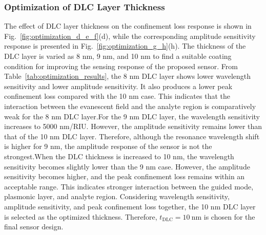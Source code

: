 \documentclass[preprint,12pt]{elsarticle}
\begin{document}
\subsubsection{\textbf{{Optimization of DLC Layer Thickness}}}
The effect of DLC layer thickness on the confinement loss response is shown in Fig.~\ref{fig:optimization_d_e_f}(d), while the corresponding amplitude sensitivity response is presented in Fig.~\ref{fig:optimization_g_h}(h).
The thickness of the DLC layer is varied as 8 nm, 9 nm, and 10 nm to find a suitable coating condition for improving the sensing response of the proposed sensor. From Table~\ref{tab:optimization_results}, the 8 nm DLC layer shows lower wavelength sensitivity and lower amplitude sensitivity. It also produces a lower peak confinement loss compared with the 10 nm case. This indicates that the interaction between the evanescent field and the analyte region is comparatively weak for the 8 nm DLC layer.For the 9 nm DLC layer, the wavelength sensitivity increases to 5000 nm/RIU. However, the amplitude sensitivity remains lower than that of the 10 nm DLC layer. Therefore, although the resonance wavelength shift is higher for 9 nm, the amplitude response of the sensor is not the strongest.When the DLC thickness is increased to 10 nm, the wavelength sensitivity becomes slightly lower than the 9 nm case. However, the amplitude sensitivity becomes higher, and the peak confinement loss remains within an acceptable range. This indicates stronger interaction between the guided mode, plasmonic layer, and analyte region. Considering wavelength sensitivity, amplitude sensitivity, and peak confinement loss together, the 10 nm DLC layer is selected as the optimized thickness. Therefore, $t_{\mathrm{DLC}} = 10~\mathrm{nm}$ is chosen for the final sensor design.
\end{document}
